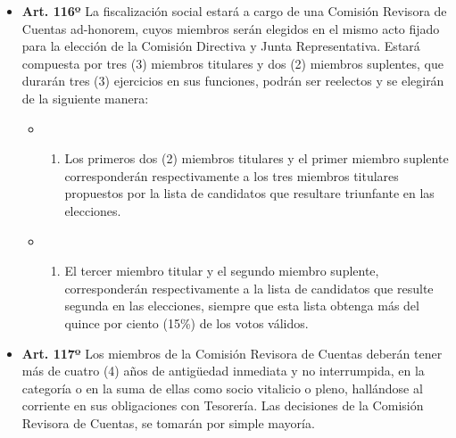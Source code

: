 \documentclass[openany]{book}
\providecommand{\tightlist}{%
  \setlength{\itemsep}{0pt}\setlength{\parskip}{0pt}}
\begin{document}
\begin{itemize}
\tightlist
\item
  \textbf{Art. 116º}
  La fiscalización social estará a cargo de una Comisión Revisora de Cuentas ad-honorem, cuyos miembros serán elegidos en el mismo acto fijado para la elección de la Comisión Directiva y Junta Representativa. Estará compuesta por tres (3) miembros titulares y dos (2) miembros suplentes, que durarán tres (3) ejercicios en sus funciones, podrán ser reelectos y se elegirán de la siguiente manera:

  \begin{itemize}
  \item
    \begin{enumerate}
    \def\labelenumi{\alph{enumi})}
    \tightlist
    \item
      Los primeros dos (2) miembros titulares y el primer miembro suplente corresponderán respectivamente a los tres miembros titulares propuestos por la lista de candidatos que resultare triunfante en las elecciones.
    \end{enumerate}
  \item
    \begin{enumerate}
    \def\labelenumi{\alph{enumi})}
    \setcounter{enumi}{1}
    \tightlist
    \item
      El tercer miembro titular y el segundo miembro suplente, corresponderán respectivamente a la lista de candidatos que resulte segunda en las elecciones, siempre que esta lista obtenga más del quince por ciento (15\%) de los votos válidos.
    \end{enumerate}
  \end{itemize}
\end{itemize}

\begin{itemize}
\tightlist
\item
  \textbf{Art. 117º}
  Los miembros de la Comisión Revisora de Cuentas deberán tener más de cuatro (4) años de antigüedad inmediata y no interrumpida, en la categoría o en la suma de ellas como socio vitalicio o pleno, hallándose al corriente en sus obligaciones con Tesorería. Las decisiones de la Comisión Revisora de Cuentas, se tomarán por simple mayoría.
\end{itemize}
\end{document}
